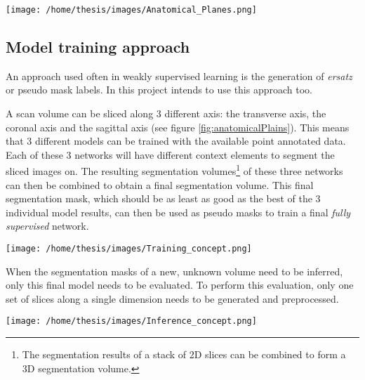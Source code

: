\begin{SCfigure}[][htb]
    \centering
    \texttt{[image: /home/thesis/images/Anatomical\_Planes.png]}
    \caption{Clarification of the anatomical planes\label{fig:anatomicalPlains}}
  \end{SCfigure}

\subsection{Model training approach}

An approach used often in weakly supervised learning is the generation of \textit{ersatz} or pseudo mask labels.
In this project intends to use this approach too.

A scan volume can be sliced along 3 different axis: the transverse axis, the coronal axis and the sagittal axis (see figure \ref{fig:anatomicalPlains}). 
This means that 3 different models can be trained with the available point annotated data. 
Each of these 3 networks will have different context elements to segment the sliced images on.
The resulting segmentation volumes\footnote{The segmentation results of a stack of 2D slices can be combined to form a 3D segmentation volume.} of these three networks can then be combined to obtain a final segmentation volume.
This final segmentation mask, which should be as least as good as the best of the 3 individual model results, can then be used as pseudo masks to train a final \textit{fully supervised} network. 

\begin{SCfigure}[][htb]
    \centering
    \texttt{[image: /home/thesis/images/Training\_concept.png]}
    \caption{\label{fig:model_training_concept}Illustration of the model training approach. 
    This is based on the conbination of 3 different models based on different volume slices.}
\end{SCfigure}

When the segmentation masks of a new, unknown volume need to be inferred, only this final model needs to be evaluated.
To perform this evaluation, only one set of slices along a single dimension needs to be generated and preprocessed.

\begin{SCfigure}[][htb]
    \centering
    \texttt{[image: /home/thesis/images/Inference\_concept.png]}
    \caption{Inference step. Only one model needs to be evaluated in this step, the model that is trianed in the final step of the training procedure illustrated in figure \ref{fig:model_training_concept}.}
\end{SCfigure}